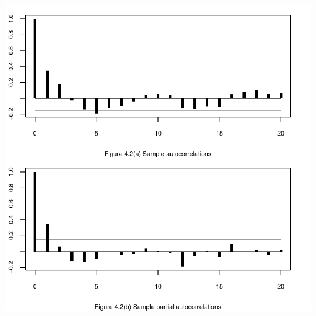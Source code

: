 \documentclass[a4paper]{article}
\renewcommand{\~}{\perispomeni}%
\begin{document}
\begin{center}
\includegraphics{Companion-027}
\end{center}
\end{document}
